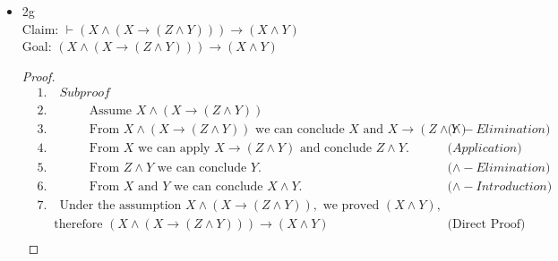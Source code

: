 \documentclass{article}
\begin{document}
\begin{itemize}
\begin{itemize}
        \item
        2g \\
        Claim: $\vdash (X \land (X \rightarrow (Z \land Y))) \rightarrow (X \land Y)$ \\
        Goal: $(X \land (X \rightarrow (Z \land Y))) \rightarrow (X \land Y)$
        \begin{proof}[Proof]
            \begin{align*}
                &1. \quad Subproof \\
                &2. \quad \hspace{1cm} \text{Assume } X \land (X \rightarrow (Z \land Y))\\
                &3. \quad \hspace{1cm} \text{From } X \land (X \rightarrow (Z \land Y)) \text{ we can conclude } X \text{ and } X \rightarrow (Z \land Y) && \text{($\land - Elimination$)}  \\
                &4. \quad \hspace{1cm} \text{From } X \text{ we can apply } X \rightarrow (Z \land Y) \text{ and conclude } Z \land Y. && \text{($Application$)} \\
                &5. \quad \hspace{1cm} \text{From } Z \land Y \text{ we can conclude } Y. && \text{($\land - Elimination$)} \\
                &6. \quad \hspace{1cm} \text{From } X \text{ and } Y \text{ we can conclude } X \land Y. && \text{($\land - Introduction$)} \\
                &7. \quad \text{Under the assumption } X \land (X \rightarrow (Z \land Y)), \text{ we proved } (X \land Y), \\
                &\quad \text{ therefore } (X \land (X \rightarrow (Z \land Y))) \rightarrow (X \land Y) && \text{(Direct Proof)} \\
            \end{align*}
        \end{proof}
    \end{itemize}
\end{itemize}
\end{document}
